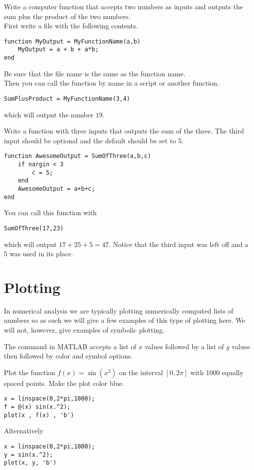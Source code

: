\begin{example}
    Write a computer function that accepts two numbers as inputs and outputs the sum plus
    the product of the two numbers. \\
    First write a file with the following contents.
\begin{lstlisting}
function MyOutput = MyFunctionName(a,b)
    MyOutput = a + b + a*b;
end
\end{lstlisting}
Be sure that the file name is the same as the function name.\\
Then you can call the function by name in a script or another function.
\begin{lstlisting}
SumPlusProduct = MyFunctionName(3,4)
\end{lstlisting}
which will output the number $19$.
\end{example}


\begin{example}
    Write a function with three inputs that outputs the sum of the three.  The third input
    should be optional and the default should be set to 5.
\begin{lstlisting}
function AwesomeOutput = SumOfThree(a,b,c)
    if nargin < 3
        c = 5;
    end
    AwesomeOutput = a+b+c;
end
\end{lstlisting}
You can call this function with
\begin{lstlisting}
SumOfThree(17,23)
\end{lstlisting}
which will output $17+25+5 = 47$.  Notice that the third input was left off and a 5 was
used in its place.
\end{example}


\section{Plotting}
In numerical analysis we are typically plotting numerically computed lists of numbers so
as such we will give a few examples of this type of plotting here.  We will not, however,
give examples of symbolic plotting.

The  command in MATLAB accepts a list of $x$ values followed by a list of $y$
values then followed by color and symbol options.\\

\begin{example}
    Plot the function $f(x) = \sin(x^2)$ on the interval $[0,2\pi]$ with 1000 equally
    spaced points.  Make the plot color blue.
\begin{lstlisting}
x = linspace(0,2*pi,1000);
f = @(x) sin(x.^2);
plot(x , f(x) , 'b')
\end{lstlisting}
Alternatively
\begin{lstlisting}
x = linspace(0,2*pi,1000);
y = sin(x.^2);
plot(x, y, 'b')
\end{lstlisting}
\end{example}



